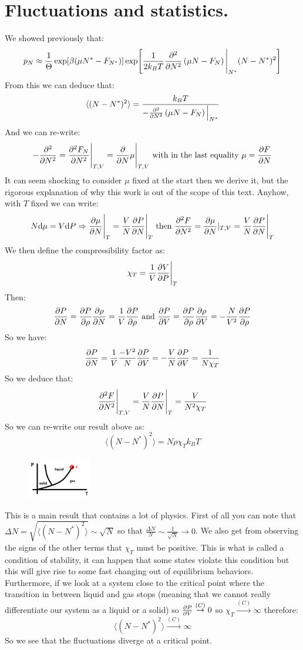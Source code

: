 \documentclass[10pt,a4paper]{book}
\begin{document}
\section{Fluctuations and statistics.}
We showed previously that:
\[
p_N \approx \frac{1}{\Theta} \exp[\beta(\mu N^* - F_{N^*})] \exp[\frac{1}{2k_B T} \pdv[2]{}{N} \left(\mu N- F_N\right)\Bigg|_{N^*} (N - N^*)^2]
\]
From this we can deduce that:
\[
\langle (N - N^*)^2 \rangle = \frac{k_B T}{- \pdv[2]{}{N} \left(\mu N - F_N\right)\Big|_{N^*}}
\]
And we can re-write:
\[
-\pdv[2]{}{N}(\mu N - F_N) = \pdv[2]{F_N}{N}\Bigg|_{T, V} = \pdv{}{N} \mu \Bigg|_{T, V} \text{ with in the last equality } \mu = \pdv{F}{N}
\]
It can seem shocking to consider $\mu$ fixed at the start then we derive it, but the rigorous explanation of why this work is out of the scope of this text. Anyhow, with $T$ fixed we can write:
\[
N \dd \mu = V \dd P \Rightarrow \pdv{\mu}{N}\Bigg|_T = \frac{V}{N} \pdv{P}{N}\Bigg|_T \text{ then } \pdv[2]{F}{N} = \pdv{\mu}{N}|_{T,V} = \frac{V}{N} \pdv{P}{N}\Bigg|_T
\]
We then define the compressibility factor as:
\[
\chi_T = \frac{1}{V} \pdv{V}{P}\Bigg|_T
\]
Then:
\[
\pdv{P}{N} = \pdv{P}{\rho} \pdv{\rho}{N} = \frac{1}{V} \pdv{P}{\rho} \text{ and } \pdv{P}{V} = \pdv{P}{\rho} \pdv{\rho}{V} = -\frac{N}{V^2} \pdv{P}{\rho}
\]
So we have:
\[
\pdv{P}{N} = \frac{1}{V} \frac{-V^2}{N} \pdv{P}{V} = -\frac{V}{N}\pdv{P}{V} = \frac{1}{N \chi_T}
\]
So we deduce that:
\[
\pdv[2]{F}{N}\Bigg|_{T, V} = \frac{V}{N} \pdv{P}{N}\Bigg|_{T} = \frac{V}{N^2 \chi_T}
\]
So we can re-write our result above as:
\[
\langle (N - N^*)^2 \rangle = N \rho \chi_T k_B T
\]
\begin{figure}
    \includegraphics[width=0.25\textwidth]{graphs/critpoint}
\end{figure}
This is a main result that contains a lot of physics. First of all you can note that $\Delta N = \sqrt{\langle (N - N^*)^2 \rangle} \sim \sqrt{N}$ so that $\frac{\Delta N}{N} \sim \frac{1}{\sqrt{N}} \rightarrow 0$. We also get from observing the signs of the other terms that $\chi_T$ must be positive. This is what is called a condition of stability, it can happen that some states violate this condition but this will give rise to some fast changing out of equilibrium behaviors. Furthermore, if we look at a system close to the critical point where the transition in between liquid and gas stops (meaning that we cannot really differentiate our system as a liquid or a solid) so $\pdv{P}{V} \stackrel{(C)}{\rightarrow} 0$ so $\chi_T \stackrel{(C)}{\rightarrow} \infty$ therefore:
\[
\langle (N - N^*)^2 \rangle \stackrel{(C)}{\rightarrow} \infty
\]
So we see that the fluctuations diverge at a critical point.
\end{document}
